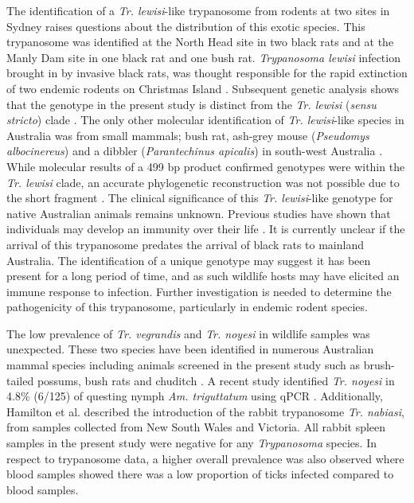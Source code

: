 \documentclass[a4paper, nobind]{templates/ociamthesis}
\begin{document}
The identification of a \emph{Tr. lewisi}-like trypanosome from rodents at two sites in Sydney raises questions about the distribution of this exotic species.
This trypanosome was identified at the North Head site in two black rats and at the Manly Dam site in one black rat and one bush rat.
\emph{Trypanosoma lewisi} infection brought in by invasive black rats, was thought responsible for the rapid extinction of two endemic rodents on Christmas Island \autocite{wyattHistoricalMammalExtinction2008,greenMammalExtinctionIntroduced2014}.
Subsequent genetic analysis shows that the genotype in the present study is distinct from the \emph{Tr. lewisi} (\emph{sensu stricto}) clade \autocite{eganMolecularIdentificationTrypanosoma2020}.
The only other molecular identification of \emph{Tr. lewisi}-like species in Australia was from small mammals; bush rat, ash-grey mouse (\emph{Pseudomys albocinereus}) and a dibbler (\emph{Parantechinus apicalis}) in south-west Australia \autocite{averisDiversityDistributionHostparasite2009}.
While molecular results of a 499 bp product confirmed genotypes were within the \emph{Tr. lewisi} clade, an accurate phylogenetic reconstruction was not possible due to the short fragment \autocite{hamiltonResolvingRelationshipsAustralian2011,eganMolecularIdentificationTrypanosoma2020}.
The clinical significance of this \emph{Tr. lewisi}-like genotype for native Australian animals remains unknown.
Previous studies have shown that individuals may develop an immunity over their life \autocite{smithTrypanosomesFleasField2005}.
It is currently unclear if the arrival of this trypanosome predates the arrival of black rats to mainland Australia.
The identification of a unique genotype may suggest it has been present for a long period of time, and as such wildlife hosts may have elicited an immune response to infection.
Further investigation is needed to determine the pathogenicity of this trypanosome, particularly in endemic rodent species.

The low prevalence of \emph{Tr. vegrandis} and \emph{Tr. noyesi} in wildlife samples was unexpected.
These two species have been identified in numerous Australian mammal species including animals screened in the present study such as brush-tailed possums, bush rats and chuditch \autocite{barbosaPrevalenceGeneticDiversity2017a,averisDiversityDistributionHostparasite2009,cooperNextGenerationSequencing2018}.
A recent study identified \emph{Tr. noyesi} in 4.8\% (6/125) of questing nymph \emph{Am. triguttatum} using qPCR \autocite{krigeMolecularDetectionTrypanosoma2021}.
Additionally, Hamilton et al. \autocite*{hamiltonInadvertentIntroductionAustralia2005} described the introduction of the rabbit trypanosome \emph{Tr. nabiasi}, from samples collected from New South Wales and Victoria.
All rabbit spleen samples in the present study were negative for any \emph{Trypanosoma} species.
In respect to trypanosome data, a higher overall prevalence was also observed where blood samples showed there was a low proportion of ticks infected compared to blood samples.
\end{document}
